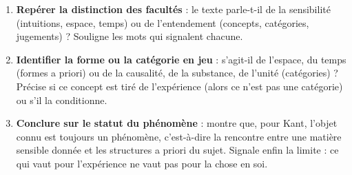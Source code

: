 \documentclass[11pt]{article}
\begin{document}
\begin{methode}
\begin{enumerate}
\item \textbf{Repérer la distinction des facultés} : le texte parle-t-il de la sensibilité (intuitions, espace, temps) ou de l'entendement (concepts, catégories, jugements) ? Souligne les mots qui signalent chacune.
\item \textbf{Identifier la forme ou la catégorie en jeu} : s'agit-il de l'espace, du temps (formes a priori) ou de la causalité, de la substance, de l'unité (catégories) ? Précise si ce concept est tiré de l'expérience (alors ce n'est pas une catégorie) ou s'il la conditionne.
\item \textbf{Conclure sur le statut du phénomène} : montre que, pour Kant, l'objet connu est toujours un phénomène, c'est-à-dire la rencontre entre une matière sensible donnée et les structures a priori du sujet. Signale enfin la limite : ce qui vaut pour l'expérience ne vaut pas pour la chose en soi.
\end{enumerate}
\end{methode}
\end{document}
